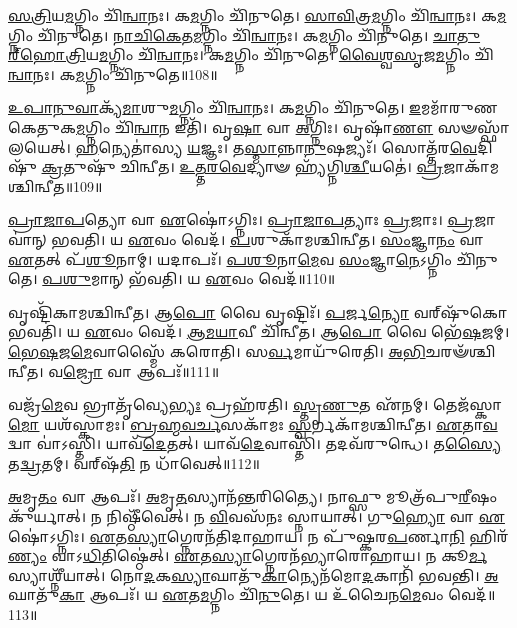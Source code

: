 \-\ul{𑌸}\-\-\ul{𑌤𑍍𑌰𑌿}\-𑌯\-\ul{𑌮}\-𑌗𑍍𑌨𑌿𑌂 𑌚𑌿᳴\-\ul{𑌨𑍍𑌵𑌾}\-𑌨𑌃। 𑌕\-\ul{𑌮}\-𑌗𑍍𑌨𑌿𑌂 𑌚𑌿᳴𑌨𑍁𑌤𑍇। 
\-\ul{𑌸𑌾}\-\-\ul{𑌵𑌿}\-𑌤𑍍𑌰\-\ul{𑌮}\-𑌗𑍍𑌨𑌿𑌂 𑌚𑌿᳴\-\ul{𑌨𑍍𑌵𑌾}\-𑌨𑌃। 𑌕\-\ul{𑌮}\-𑌗𑍍𑌨𑌿𑌂 𑌚𑌿᳴𑌨𑍁𑌤𑍇। 
\-\ul{𑌨𑌾}\-\-\ul{𑌚𑌿}\-\-\ul{𑌕𑍇}\-𑌤\-\ul{𑌮}\-𑌗𑍍𑌨𑌿𑌂 𑌚𑌿᳴\-\ul{𑌨𑍍𑌵𑌾}\-𑌨𑌃। 𑌕\-\ul{𑌮}\-𑌗𑍍𑌨𑌿𑌂 𑌚𑌿᳴𑌨𑍁𑌤𑍇। 
\-\ul{𑌚𑌾}\-\-\ul{𑌤𑍁}\-\ul{𑌰𑍍}‌\-\ul{𑌹𑍋}\-\-\ul{𑌤𑍍𑌰𑌿}\-𑌯\-\-\ul{𑌮}\-𑌗𑍍𑌨𑌿𑌂 𑌚𑌿᳴\-\ul{𑌨𑍍𑌵𑌾}\-𑌨𑌃। 𑌕\-\ul{𑌮}\-𑌗𑍍𑌨𑌿𑌂 𑌚𑌿᳴𑌨𑍁𑌤𑍇। 
\-\ul{𑌵𑍈}\-\-\ul{𑌶𑍍𑌵}\-\-\ul{𑌸𑍃}\-𑌜\-\ul{𑌮}\-𑌗𑍍𑌨𑌿𑌂 𑌚𑌿᳴\-\ul{𑌨𑍍𑌵𑌾}\-𑌨𑌃। 𑌕\-\ul{𑌮}\-𑌗𑍍𑌨𑌿𑌂 𑌚𑌿᳴𑌨𑍁𑌤𑍇॥108॥


\-\ul{𑌉}\-\-\ul{𑌪𑌾}\-\-\ul{𑌨𑍁}\-\-\ul{𑌵𑌾}\-𑌕𑍍𑌯᳴\-\ul{𑌮𑌾}\-𑌶𑍁\-\ul{𑌮}\-𑌗𑍍𑌨𑌿𑌂 𑌚𑌿᳴\-\ul{𑌨𑍍𑌵𑌾}\-𑌨𑌃। 𑌕\-\ul{𑌮}\-𑌗𑍍𑌨𑌿𑌂 𑌚𑌿᳴𑌨𑍁𑌤𑍇। 
\-\ul{𑌇}\-𑌮\-𑌮𑌾᳴𑌰𑍁𑌣\-𑌕𑍇𑌤𑍁𑌕\-\-\ul{𑌮}\-𑌗𑍍𑌨𑌿𑌂 𑌚𑌿᳴\-\ul{𑌨𑍍𑌵𑌾}\-𑌨 𑌇𑌤𑌿᳴। 𑌵𑍃\-\ul{𑌷𑌾} 𑌵𑌾 \ul{𑌅}\-𑌗𑍍𑌨𑌿𑌃। 
𑌵𑍃𑌷𑌾᳴\-\ul{𑌣𑍗} 𑌸𑍟𑌸𑍍𑌫𑌾᳴𑌲𑌯𑍇𑌤𑍍। \ul{𑌹}\-𑌨𑍍𑌯𑍇𑌤𑌾॑𑌸𑍍𑌯 \ul{𑌯}\-𑌜𑍍𑌞𑌃। 
𑌤\-\ul{𑌸𑍍𑌮𑌾}\-𑌨𑍍𑌨𑌾\-\ul{𑌨𑍁}\-𑌷𑌜𑍍𑌯𑌃᳴। 𑌸𑍋𑌤𑍍𑌤᳴𑌰\-\ul{𑌵𑍇}\-𑌦𑌿𑌷𑍁᳴ \ul{𑌕𑍍𑌰}\-𑌤𑍁𑌷𑍁᳴ 𑌚𑌿𑌨𑍍𑌵𑍀𑌤। 
\-\ul{𑌉}\-\-\ul{𑌤𑍍𑌤}\-\-\ul{𑌰}\-\-\ul{𑌵𑍇}\-𑌦𑍍𑌯𑌾𑍟 𑌹𑍍𑌯᳴𑌗𑍍𑌨𑌿\-\ul{𑌶𑍍𑌚𑍀}\-𑌯𑌤𑍇॑। \ul{𑌪𑍍𑌰}\-𑌜𑌾𑌕𑌾᳴𑌮𑌶𑍍𑌚𑌿𑌨𑍍𑌵𑍀𑌤॥109॥


\-\ul{𑌪𑍍𑌰𑌾}\-\-\ul{𑌜𑌾}\-\-\ul{𑌪}\-𑌤𑍍𑌯𑍋 𑌵𑌾 \ul{𑌏}\-𑌷𑍋॑𑌽𑌗𑍍𑌨𑌿𑌃। \ul{𑌪𑍍𑌰𑌾}\-\-\ul{𑌜𑌾}\-\-\ul{𑌪}\-𑌤𑍍𑌯𑌾𑌃 \ul{𑌪𑍍𑌰}\-𑌜𑌾𑌃। 
\-\ul{𑌪𑍍𑌰}\-𑌜𑌾𑌵𑌾॑𑌨𑍍‌ 𑌭𑌵𑌤𑌿। 𑌯 \ul{𑌏}\-𑌵𑌂 𑌵𑍇𑌦᳴। 
\-\ul{𑌪}\-𑌶𑍁𑌕𑌾᳴𑌮𑌶𑍍𑌚𑌿𑌨𑍍𑌵𑍀𑌤। \ul{𑌸𑌂}\-𑌜𑍍𑌞𑌾\-\ul{𑌨𑌂} 𑌵𑌾 \ul{𑌏}\-𑌤𑌤𑍍 𑌪᳴\-\ul{𑌶𑍂}\-𑌨𑌾𑌮𑍍। 
𑌯𑌦𑌾𑌪𑌃᳴। \ul{𑌪}\-\-\ul{𑌶𑍂}\-𑌨𑌾\-\ul{𑌮𑍇}\-𑌵 \ul{𑌸𑌂}\-𑌜𑍍𑌞𑌾\-\ul{𑌨𑍇}\-𑌽𑌗𑍍𑌨𑌿𑌂 𑌚𑌿᳴𑌨𑍁𑌤𑍇। 
\-\ul{𑌪}\-\-\ul{𑌶𑍁}\-𑌮𑌾𑌨𑍍 𑌭᳴𑌵𑌤𑌿। 𑌯 \ul{𑌏}\-𑌵𑌂 𑌵𑍇𑌦᳴॥110॥


𑌵𑍃𑌷𑍍𑌟𑌿᳴𑌕𑌾𑌮𑌶𑍍𑌚𑌿𑌨𑍍𑌵𑍀𑌤। 𑌆\-\ul{𑌪𑍋} 𑌵𑍈 𑌵𑍃𑌷𑍍𑌟𑌿𑌃᳴। 
\-\ul{𑌪}\-𑌰𑍍𑌜\-\ul{𑌨𑍍𑌯𑍋} 𑌵𑌰𑍍‌𑌷𑍁᳴𑌕𑍋 𑌭𑌵𑌤𑌿। 𑌯 \ul{𑌏}\-𑌵𑌂 𑌵𑍇𑌦᳴। 
\-\ul{𑌆}\-\-\ul{𑌮}\-\-\ul{𑌯𑌾}\-𑌵𑍀 𑌚𑌿᳴𑌨𑍍𑌵𑍀𑌤। 𑌆\-\ul{𑌪𑍋} 𑌵𑍈 𑌭𑍇᳴\-\ul{𑌷}\-𑌜𑌮𑍍। 
\-\ul{𑌭𑍇}\-\-\ul{𑌷}\-𑌜\-\ul{𑌮𑍇}\-𑌵𑌾𑌸𑍍𑌮𑍈᳴ 𑌕𑌰𑍋𑌤𑌿। 𑌸\-\ul{𑌰𑍍𑌵}\-𑌮𑌾𑌯𑍁᳴𑌰𑍇𑌤𑌿। 
\-\ul{𑌅}\-\-\ul{𑌭𑌿}\-𑌚𑌰𑍟᳴𑌶𑍍𑌚𑌿𑌨𑍍𑌵𑍀𑌤। 𑌵\-\ul{𑌜𑍍𑌰𑍋} 𑌵𑌾 𑌆𑌪𑌃᳴॥111॥


𑌵𑌜𑍍𑌰᳴\-\ul{𑌮𑍇}\-𑌵 𑌭𑍍𑌰𑌾𑌤𑍃᳴𑌵𑍍𑌯𑍇\-\ul{𑌭𑍍𑌯𑌃} 𑌪𑍍𑌰𑌹᳴𑌰𑌤𑌿। \ul{𑌸𑍍𑌤𑍃}\-\-\ul{𑌣𑍁}\-𑌤 𑌏᳴𑌨𑌮𑍍। 
𑌤𑍇𑌜᳴𑌸𑍍𑌕𑌾\-\ul{𑌮𑍋} 𑌯𑌶᳴𑌸𑍍𑌕𑌾𑌮𑌃। \ul{𑌬𑍍𑌰}\-\-\ul{𑌹𑍍𑌮}\-\-\ul{𑌵}\-\-\ul{𑌰𑍍𑌚}\-𑌸𑌕𑌾᳴𑌮𑌃 \ul{𑌸𑍍𑌵}\-𑌰𑍍𑌗𑌕𑌾᳴𑌮𑌶𑍍𑌚𑌿𑌨𑍍𑌵𑍀𑌤। 
\-\ul{𑌏}\-𑌤𑌾\-\ul{𑌵}\-𑌦𑍍𑌵𑌾 𑌵𑌾॑𑌽𑌸𑍍𑌤𑌿। 𑌯𑌾𑌵᳴\-\ul{𑌦𑍇}\-𑌤𑌤𑍍। 
𑌯𑌾𑌵᳴\-\ul{𑌦𑍇}\-𑌵𑌾𑌸𑍍𑌤𑌿᳴। 𑌤𑌦𑌵᳴𑌰𑍁𑌨𑍍𑌧𑍇। 
𑌤\-\ul{𑌸𑍍𑌯𑍈}\-𑌤\-\ul{𑌦𑍍𑌵𑍍𑌰}\-𑌤𑌮𑍍। 𑌵𑌰𑍍‌𑌷᳴\-\ul{𑌤𑌿} 𑌨 𑌧𑌾᳴𑌵𑍇𑌤𑍍॥112॥


\-\ul{𑌅}\-𑌮𑍃\-\ul{𑌤𑌂} 𑌵𑌾 𑌆𑌪𑌃᳴। \ul{𑌅}\-𑌮𑍃\-\ul{𑌤}\-𑌸𑍍𑌯𑌾𑌨᳴𑌨𑍍𑌤𑌰𑌿𑌤𑍍𑌯𑍈। 
𑌨𑌾𑌫𑍍𑌸𑍁 𑌮𑍂𑌤𑍍𑌰᳴𑌪𑍁\-\ul{𑌰𑍀}\-𑌷𑌂 𑌕𑍁᳴𑌰𑍍𑌯𑌾𑌤𑍍। 𑌨 𑌨𑌿𑌷𑍍𑌠𑍀᳴𑌵𑍇𑌤𑍍। 
𑌨 \ul{𑌵𑌿}\-𑌵𑌸᳴𑌨𑌃 𑌸𑍍𑌨𑌾𑌯𑌾𑌤𑍍। 𑌗𑍁\-\ul{𑌹𑍍𑌯𑍋} 𑌵𑌾 \ul{𑌏}\-𑌷𑍋॑𑌽𑌗𑍍𑌨𑌿𑌃। 
\-\ul{𑌏}\-𑌤\-\ul{𑌸𑍍𑌯𑌾}\-𑌗𑍍𑌨𑍇𑌰𑌨᳴𑌤𑌿𑌦𑌾𑌹𑌾𑌯। 𑌨 𑌪𑍁᳴𑌷𑍍𑌕𑌰\-\ul{𑌪}\-𑌰𑍍𑌣𑌾\-\ul{𑌨𑌿} 𑌹𑌿𑌰᳴\-\ul{𑌣𑍍𑌯𑌂} 𑌵𑌾𑌽\-\ul{𑌧𑌿}\-𑌤𑌿𑌷𑍍𑌠𑍇॑𑌤𑍍। 
\-\ul{𑌏}\-𑌤\-\ul{𑌸𑍍𑌯𑌾}\-𑌗𑍍𑌨𑍇𑌰𑌨᳴𑌭𑍍𑌯𑌾𑌰𑍋𑌹𑌾𑌯। 𑌨 𑌕𑍂\-\ul{𑌰𑍍𑌮}\-𑌸𑍍𑌯𑌾𑌶𑍍𑌨𑍀᳴𑌯𑌾𑌤𑍍। 
𑌨𑍋\-\ul{𑌦}\-𑌕\-\ul{𑌸𑍍𑌯𑌾}\-𑌘𑌾𑌤𑍁᳴\-\ul{𑌕𑌾}\-𑌨𑍍𑌯𑍇𑌨᳴\-𑌮𑍋\-\ul{𑌦}\-𑌕𑌾𑌨𑌿᳴ 𑌭𑌵𑌨𑍍𑌤𑌿। \ul{𑌅}\-𑌘𑌾𑌤𑍁᳴\-\ul{𑌕𑌾} 𑌆𑌪𑌃᳴। 
𑌯 \ul{𑌏}\-𑌤\-\ul{𑌮}\-𑌗𑍍𑌨𑌿𑌂 𑌚𑌿᳴\-\ul{𑌨𑍁}\-𑌤𑍇। 𑌯 𑌉᳴𑌚𑍈𑌨\-\ul{𑌮𑍇}\-𑌵𑌂 𑌵𑍇𑌦᳴॥113॥\anuvakamend


